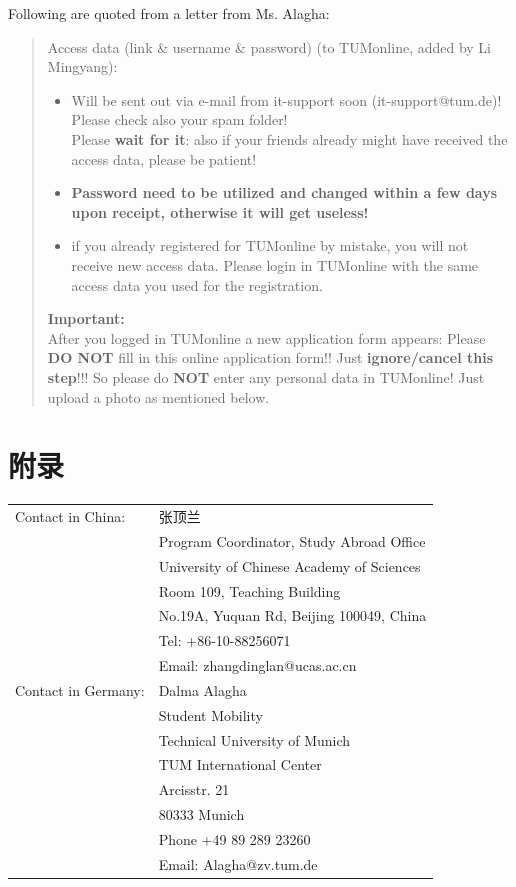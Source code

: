 \documentclass{article}
\begin{document}
Following are quoted from a letter from Ms. Alagha:
\begin{quotation}
Access data (link \& username \& password) {\color{gray}(to TUMonline, added by Li Mingyang)}:
\begin{itemize}
\renewcommand\labelitemi{--}  %
\item Will be sent out via e-mail from it-support soon (it-support@tum.de)!
Please check also your spam folder!\\
Please \textbf{wait for it}: also if your friends already might have received the access data, please be patient!
\item \textbf{Password need to be {\color{blue}utilized and changed within a few days upon receipt}, otherwise it will get useless!}
\item if you already registered for TUMonline by mistake, you will not receive new access data. Please login in TUMonline with the same access data you used for the registration.
\end{itemize}
 
\textbf{Important:}\\
After you logged in TUMonline a new application form appears: Please \textbf{DO NOT} fill in this online application form!! Just \textbf{\color{blue}ignore/cancel this step}!!! So please do \textbf{NOT} enter any personal data in TUMonline! Just upload a photo as mentioned below.
\end{quotation}

\section{附录}\label{ap}
\newpage

\begin{table}[!htbp]
\centering
\begin{tabular}{ll}
\toprule
Contact in China: & 张顶兰 \\
& Program Coordinator, Study Abroad Office \\
& University of Chinese Academy of Sciences \\
& Room 109, Teaching Building \\
& No.19A, Yuquan Rd, Beijing 100049, China \\
& Tel: +86-10-88256071 \\
& Email: zhangdinglan@ucas.ac.cn \\ \midrule
Contact in Germany: & Dalma Alagha \\
& Student Mobility \\
& Technical University of Munich\\
& TUM International Center \\
& Arcisstr. 21 \\
& 80333 Munich \\
& Phone +49 89 289 23260 \\
& Email: Alagha@zv.tum.de \\ \bottomrule
\end{tabular}
\end{table}
\end{document}
